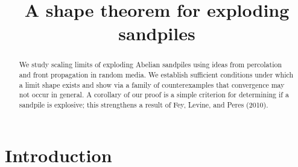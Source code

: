 \documentclass[aap]{imsart}
\begin{document}
\begin{frontmatter}
\title{A shape theorem for exploding sandpiles}


\begin{aug}
\author{ }
\address{University of Chicago}

\end{aug}

\begin{abstract}
We study scaling limits of exploding Abelian sandpiles using ideas from percolation and front propagation in random media. 
We establish sufficient conditions under which a limit shape exists and show via a family of counterexamples that convergence may not occur in general. A corollary of our proof is a simple criterion for determining if a sandpile is explosive; this 
strengthens a result of Fey, Levine, and Peres (2010). 
\end{abstract}

\begin{keyword}[class=MSC2020]
\end{keyword}

\begin{keyword}
\end{keyword}

\end{frontmatter}




\section{Introduction}
\end{document}
